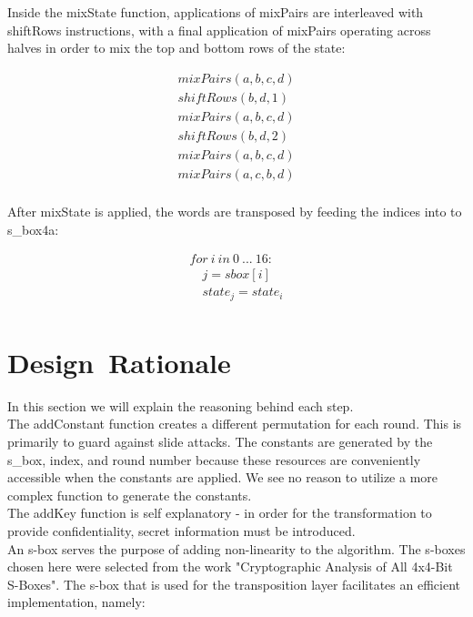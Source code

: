 \documentclass[preprint]{iacrtrans}
\begin{document}
Inside the mixState function, applications of mixPairs are interleaved with shiftRows instructions, with a final application of mixPairs operating across halves in order to mix the top and bottom rows of the state:

\begin{align}
mixPairs(a, b, c, d)\\
shiftRows(b, d, 1) \\
mixPairs(a, b, c, d) \\
shiftRows(b, d, 2) \\
mixPairs(a, b, c, d) \\
mixPairs(a, c, b, d) \\
\end{align}

After mixState is applied, the words are transposed by feeding the indices into to s\_box4a:

\begin{align}
for\ i\ in\ 0\ ...\ 16:\\
	\quad j = sbox[i] \\
	\quad state_j = state_i \\
\end{align}

\section{Design\ Rationale}
In this section we will explain the reasoning behind each step. \\

The addConstant function creates a different permutation for each round. This is primarily to guard against slide attacks. The constants are generated by the s\_box, index, and round number because these resources are conveniently accessible when the constants are applied. We see no reason to utilize a more complex function to generate the constants. \\

The addKey function is self explanatory - in order for the transformation to provide confidentiality, secret information must be introduced. \\

An s-box serves the purpose of adding non-linearity to the algorithm. The s-boxes chosen here were selected from the work "Cryptographic Analysis of All 4x4-Bit S-Boxes". The s-box that is used for the transposition layer facilitates an efficient implementation, namely:
\end{document}
